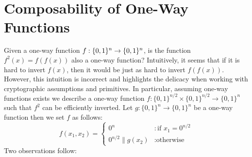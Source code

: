 \section{Composability of One-Way Functions}
Given a one-way function $f : \{ 0, 1 \}^{n} \rightarrow \{ 0, 1 \}^{n}$, is the function $f^2(x) = f(f(x))$ also a one-way function?  Intuitively, it seems that if it is hard to invert $f(x)$, then it would be just as hard to invert $f(f(x))$.   However, this intuition is incorrect and highlights the delicacy when working with cryptographic assumptions and primitives. In particular, assuming one-way functions exists we describe a one-way function $f: \{0,1\}^{n/2}\times \{0,1\}^{n/2} \rightarrow \{0,1\}^{n}$ such that $f^2$ can be efficiently inverted.
Let $g: \{0,1\}^n \rightarrow \{0,1\}^n$ be a one-way function then we set $f$ as follows:
$$f(x_1,x_2) = \left\{
\begin{array}{ll}
  0^{n} & : \text{if } x_1 = 0^{n/2} \\
  0^{n/2}\|g(x_2) & : \text{otherwise}
\end{array}
\right.$$
Two observations follow:
